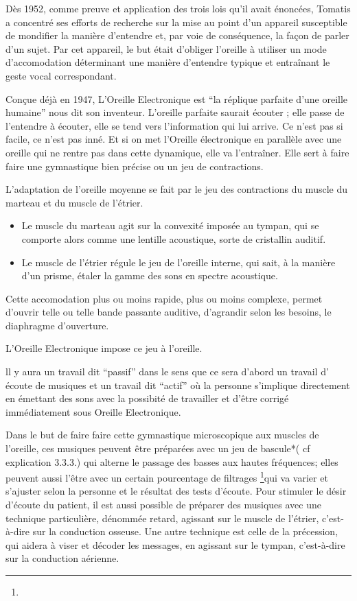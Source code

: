Dès 1952, comme preuve et application des trois lois qu'il avait énoncées,
Tomatis a concentré ses efforts de recherche sur la mise au point
d'un appareil susceptible de mondifier la manière d'entendre et, par
voie de conséquence, la façon de parler d'un sujet. Par cet appareil,
le but était d'obliger l'oreille à utiliser un mode d'accomodation
déterminant une manière d'entendre typique et entraînant le geste
vocal correspondant.

Conçue déjà en 1947, L'Oreille Electronique est ``la réplique parfaite
d'une oreille humaine'' nous dit son inventeur. L'oreille parfaite
saurait écouter ; elle passe de l'entendre à écouter, elle se tend
vers l'information qui lui arrive. Ce n'est pas si facile, ce n'est
pas inné. Et si on met l'Oreille électronique en parallèle avec une
oreille qui ne rentre pas dans cette dynamique, elle va l'entraîner.
Elle sert à faire faire une gymnastique bien précise ou un jeu de
contractions.

L'adaptation de l'oreille moyenne se fait par le jeu des contractions
du muscle du marteau et du muscle de l'étrier.
\begin{itemize}
\item Le muscle du marteau agit sur la convexité imposée au tympan, qui
se comporte alors comme une lentille acoustique, sorte de cristallin
auditif.
\item Le muscle de l'étrier régule le jeu de l'oreille interne, qui sait,
à la manière d'un prisme, étaler la gamme des sons en spectre acoustique.
\end{itemize}
Cette accomodation plus ou moins rapide, plus ou moins complexe, permet
d'ouvrir telle ou telle bande passante auditive, d'agrandir selon
les besoins, le diaphragme d'ouverture.

L'Oreille Electronique impose ce jeu à l'oreille.

ll y aura un travail dit ``passif'' dans le sens que ce sera d'abord
un travail d' écoute de musiques et un travail dit ``actif'' où
la personne s'implique directement en émettant des sons avec la possibité
de travailler et d'être corrigé immédiatement sous Oreille Electronique.

Dans le but de faire faire cette gymnastique microscopique aux muscles
de l'oreille, ces musiques peuvent être préparées avec un jeu de bascule{*}(
cf explication 3.3.3.) qui alterne le passage des basses aux hautes
fréquences; elles peuvent aussi l'être avec un certain pourcentage
de filtrages \footnote{}qui va varier et s'ajuster selon la personne
et le résultat des tests d'écoute. Pour stimuler le désir d'écoute
du patient, il est aussi possible de préparer des musiques avec une
technique particulière, dénommée retard, agissant sur le muscle de
l'étrier, c'est-à-dire sur la conduction osseuse. Une autre technique
est celle de la précession, qui aidera à viser et décoder les messages,
en agissant sur le tympan, c'est-à-dire sur la conduction aérienne. 

